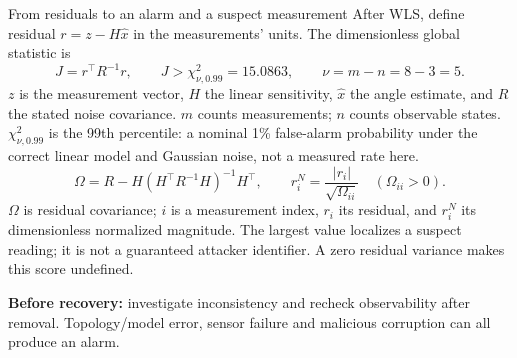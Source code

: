 \begin{frame}[t]{From residuals to an alarm and a suspect measurement}
\small
After WLS, define residual $r=z-H\hat x$ in the measurements' units. The dimensionless global statistic is
\[
J=r^\top R^{-1}r,\qquad J>\chi^2_{\nu,0.99}=15.0863,\qquad \nu=m-n=8-3=5.
\]
\footnotesize $z$ is the measurement vector, $H$ the linear sensitivity, $\hat x$ the angle estimate, and $R$ the stated noise covariance. $m$ counts measurements; $n$ counts observable states. $\chi^2_{\nu,0.99}$ is the 99th percentile: a nominal 1\% false-alarm probability under the correct linear model and Gaussian noise, not a measured rate here.
\[
\Omega=R-H(H^\top R^{-1}H)^{-1}H^\top,\qquad
r_i^N=\frac{|r_i|}{\sqrt{\Omega_{ii}}}\quad(\Omega_{ii}>0).
\]
$\Omega$ is residual covariance; $i$ is a measurement index, $r_i$ its residual, and $r_i^N$ its dimensionless normalized magnitude. The largest value localizes a suspect reading; it is not a guaranteed attacker identifier. A zero residual variance makes this score undefined.
\smallskip\par\small
\textbf{Before recovery:} investigate inconsistency and recheck observability after removal. Topology/model error, sensor failure and malicious corruption can all produce an alarm.
\end{frame}

